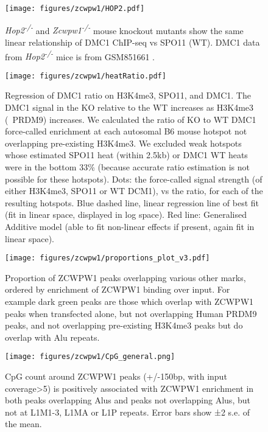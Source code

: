 \begin{figure}[H]
	\centering
	\texttt{[image: figures/zcwpw1/HOP2.pdf]}
	\caption[HOP2 KO Phenocopying]{
		\textit{Hop2\textsuperscript{-/-}} and \textit{Zcwpw1\textsuperscript{-/-}} mouse knockout mutants show the same linear relationship of DMC1 ChIP-seq vs SPO11 (WT).
		DMC1 data from \textit{Hop2\textsuperscript{-/-}} mice is from GSM851661 \parencite{Khil2012Sensitive}.
	}
	\label{fig:HOP2}
\end{figure}


\begin{figure}[H]
	\centering
	\texttt{[image: figures/zcwpw1/heatRatio.pdf]}
	\caption[DMC1 ratio regression]{
		Regression of DMC1 ratio on H3K4me3, SPO11, and DMC1.
		The DMC1 signal in the KO relative to the WT increases as H3K4me3 (~PRDM9) increases.
		We calculated the ratio of KO to WT DMC1 force-called enrichment at each autosomal B6 mouse hotspot not overlapping pre-existing H3K4me3.
		We excluded weak hotspots whose estimated SPO11 heat (within 2.5kb) or DMC1 WT heats were in the bottom 33\% (because accurate ratio estimation is not possible for these hotspots).
		Dots: the force-called signal strength (of either H3K4me3, SPO11 or WT DCM1), vs the ratio, for each of the resulting hotspots.
		Blue dashed line, linear regression line of best fit (fit in linear space, displayed in log space).
		Red line: Generalised Additive model (able to fit non-linear effects if present, again fit in linear space).
	}
	\label{fig:heatRatio}
\end{figure}


\begin{figure}[H]
	\centering
	\texttt{[image: figures/zcwpw1/proportions\_plot\_v3.pdf]}
	\caption[ChIPseq peaks proportions]{
		Proportion of ZCWPW1 peaks overlapping various other marks, ordered by enrichment of ZCWPW1 binding over input.
		For example dark green peaks are those which overlap with ZCWPW1 peaks when transfected alone, but not overlapping Human PRDM9 peaks, and not overlapping pre-existing H3K4me3 peaks but do overlap with Alu repeats.
	}
	\label{fig:proportions}
\end{figure}


\begin{figure}[H]
	\centering
	\texttt{[image: figures/zcwpw1/CpG\_general.png]}
	\caption[CpG counts for various repeats]{
		CpG count around ZCWPW1 peaks (+/-150bp, with input coverage>5) is positively associated with ZCWPW1 enrichment in both peaks overlapping Alus and peaks not overlapping Alus, but not at L1M1-3, L1MA or L1P repeats.
		Error bars show ±2 s.e. of the mean. 
	}
	\label{fig:CpG_general}
\end{figure}
